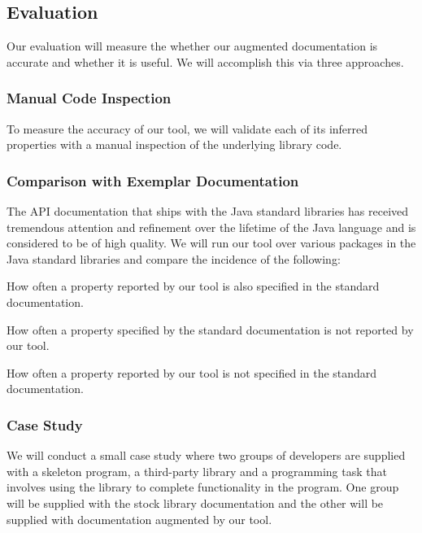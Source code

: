 \documentclass[letterpaper,12pt]{article}
\let\Itemize =\itemize
\def\Nospacing{\itemsep=0pt\topsep=0pt\partopsep=0pt\parskip=0pt\parsep=0pt}
\renewenvironment{itemize}{\Itemize\Nospacing}{\endlist}
\begin{document}
\subsection*{Evaluation}

Our evaluation will measure the whether our augmented documentation is accurate
and whether it is useful. We will accomplish this via three approaches.

\subsubsection*{Manual Code Inspection}
To measure the accuracy of our tool, we will validate each of its inferred
properties with a manual inspection of the underlying library code.

\subsubsection*{Comparison with Exemplar Documentation}
The API documentation that ships with the Java standard libraries has received
tremendous attention and refinement over the lifetime of the Java language and
is considered to be of high quality. We will run our tool over various packages
in the Java standard libraries and compare the incidence of the following:

\begin{itemize}
\item How often a property reported by our tool is also specified in the
  standard documentation.

\item How often a property specified by the standard documentation is not
  reported by our tool.

\item How often a property reported by our tool is not specified in the
  standard documentation.
\end{itemize}

\subsubsection*{Case Study}
We will conduct a small case study where two groups of developers are supplied
with a skeleton program, a third-party library and a programming task that
involves using the library to complete functionality in the program. One group
will be supplied with the stock library documentation and the other will be
supplied with documentation augmented by our tool.
\end{document}
